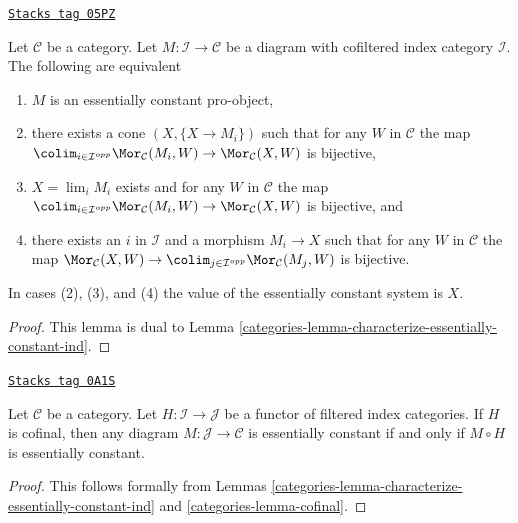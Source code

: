 \begin{lemma}
\label{categories-lemma-characterize-essentially-constant-pro}
\href{https://stacks.math.columbia.edu/tag/05PZ}{\texttt{Stacks tag 05PZ}}

Let $\mathcal{C}$ be a category. Let $M : \mathcal{I} \to \mathcal{C}$
be a diagram with cofiltered index category $\mathcal{I}$.
The following are equivalent
\begin{enumerate}
\item $M$ is an essentially constant pro-object,
\item there exists a cone $(X, \{X \to M_i\})$
such that for any $W$ in $\mathcal{C}$ the map
$\colim_{i \in \mathcal{I}^{opp}} \Mor_\mathcal{C}(M_i, W) \to
\Mor_\mathcal{C}(X, W)$ is bijective,
\item $X = \lim_i M_i$ exists and for any $W$ in $\mathcal{C}$
the map
$\colim_{i \in \mathcal{I}^{opp}} \Mor_\mathcal{C}(M_i, W) \to
\Mor_\mathcal{C}(X, W)$ is bijective, and
\item there exists an $i$ in $\mathcal{I}$ and a morphism $M_i \to X$
such that for any $W$ in $\mathcal{C}$ the map $\Mor_\mathcal{C}(X, W) \to
\colim_{j \in \mathcal{I}^{opp}} \Mor_\mathcal{C}(M_j, W)$ is bijective.
\end{enumerate}
In cases (2), (3), and (4) the value of the essentially constant system is $X$.
\end{lemma}

\begin{proof}

This lemma is dual to Lemma \ref{categories-lemma-characterize-essentially-constant-ind}.
\end{proof}

\begin{lemma}
\label{categories-lemma-cofinal-essentially-constant}
\href{https://stacks.math.columbia.edu/tag/0A1S}{\texttt{Stacks tag 0A1S}}

Let $\mathcal{C}$ be a category. Let $H : \mathcal{I} \to \mathcal{J}$
be a functor of filtered index categories. If $H$ is cofinal, then
any diagram $M : \mathcal{J} \to \mathcal{C}$ is essentially constant
if and only if $M \circ H$ is essentially constant.
\end{lemma}

\begin{proof}

This follows formally from
Lemmas \ref{categories-lemma-characterize-essentially-constant-ind} and
\ref{categories-lemma-cofinal}.
\end{proof}

